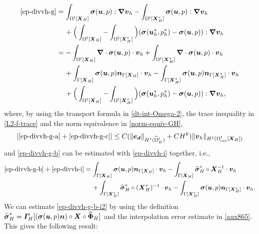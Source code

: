 \documentclass[11pt,reqno]{amsart}
\theoremstyle{definition}
\theoremstyle{plain}
\numberwithin{theorem}{section}
\numberwithin{proposition}{section}
\numberwithin{lemma}{section}
\numberwithin{equation}{section}
\newcommand{\bs}[1]{\boldsymbol{#1}}
\newcommand{\uu}[1]  {{\bs{#1}} }
\newcommand{\dep}{{{\bs{d}}}}
\newcommand{\grad}   { \uu{\nabla}    }
\newcommand{\bv}{{\bs v}}
\newcommand{\bu}{\uu{u}}
\renewcommand{\(}{\bigl(}
\renewcommand{\)}{\bigr)}
\begin{document}
\begin{subequations}\label{ep-divvh-g1}
\begin{align}
\eqref{ep-divvh-g} 
&= \int_{\Omega^{\rm f}[\bs X_H]} {\bs\sigma}(\bu,p): \grad \bv_h 
- \int_{\Omega^{\rm f}[\bs X_H^*]} {\bs\sigma}(\bu,p): \grad \bv_h \notag\\
&\quad\,
+ \Big( \int_{\Omega^{\rm f}[\bs X_H]} - \int_{\Omega^{\rm f}[\bs X_H^*]} \Big) ({\bs\sigma}(\bu_h^*,p_h^*)-{\bs\sigma}(\bu,p)): \grad \bv_h \notag\\  
&= -\int_{\Omega^{\rm f}[\bs X_H]} \grad\cdot{\bs\sigma}(\bu,p) \cdot \bv_h 
+ \int_{\Omega^{\rm f}[\bs X_H^*]} \grad\cdot{\bs\sigma}(\bu,p) \cdot \bv_h \label{ep-divvh-g-a}\\
&\quad\, 
+ \int_{\Gamma[\bs X_H]} {\bs\sigma}(\bu,p){\bs n}_{\Gamma[\bs X_H]}\cdot\bv_h 
- \int_{\Gamma[\bs X_H^*]} {\bs\sigma}(\bu,p){\bs n}_{\Gamma[\bs X_H^*]}\cdot\bv_h \label{ep-divvh-g-b}\\
&\quad\, 
+ \Big( \int_{\Omega^{\rm f}[\bs X_H]} - \int_{\Omega^{\rm f}[\bs X_H^*]} \Big) ({\bs\sigma}(\bu_h^*,p_h^*) - {\bs\sigma}(\bu,p)): \grad \bv_h ,\label{ep-divvh-g-c} 
\end{align}
\end{subequations}
where, by using the transport formula in \eqref{dt-int-Omega-2}, the trace inequality in \eqref{L2-f-trace} and the norm equivalence in \eqref{norm-equiv-GH}, 
\begin{align}\label{ep-divvh-g-ac} 
| \eqref{ep-divvh-g-a} + \eqref{ep-divvh-g-c} | 
\le C(\|{\bs e}_\dep\|_{H^1(\widehat{\Omega}^{\rm s}_H)} + CH^k) \|{\bs v}_h\|_{H^1(\Omega^{\rm f}_{\rm ext}[\bs X_H])} 
\end{align}
and \eqref{ep-divvh-g-b} can be estimated with \eqref{ep-divvh-i} together, i.e., 
\begin{subequations}\label{ep-divvh-g-b-i12}
\begin{align}
\eqref{ep-divvh-g-b} + \eqref{ep-divvh-i} 
&= 
\int_{\Gamma[\bs X_H]} {\bs\sigma}(\bu,p){\bs n}_{\Gamma[\bs X_H]}\cdot\bv_h 
- \int_{\Gamma[\bs X_H]} {\widehat{\bs\sigma}}_H^*\circ{\bs X}_H^{-1} \cdot \bv_h \label{ep-divvh-g-b-i1}\\
&\quad\, 
+ \int_{\Gamma[\bs X_H^*]} {\widehat{\bs\sigma}}_H^* \circ({\bs X}_H^*)^{-1} \cdot \bv_h  
- \int_{\Gamma[\bs X_H^*]} {\bs\sigma}(\bu,p){\bs n}_{\Gamma[\bs X_H^*]}\cdot \bv_h .
\label{ep-divvh-g-b-i2}
\end{align}
\end{subequations}
We can estimate \eqref{ep-divvh-g-b-i2} by using the definition ${\widehat{\bs\sigma}}_H^* ={\bs I}_H^{\rm s}[({\bs\sigma}(\bu,p){\bs n})\circ{\bs X} \circ \widehat{\bs\Phi}_H ]$ and the interpolation error estimate in \eqref{aux865}. This gives the following result: 
\end{document}
